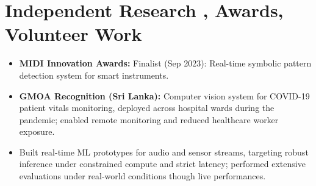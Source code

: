 \documentclass[11pt]{article}
\begin{document}
\section*{Independent Research , Awards, Volunteer Work}
\begin{itemize}[leftmargin=1.2em, itemsep=-0.25em]
    \item \textbf{MIDI Innovation Awards:} Finalist (Sep 2023): Real-time symbolic pattern detection system for smart instruments.
    \item \textbf{GMOA Recognition (Sri Lanka):} Computer vision system for COVID-19 patient vitals monitoring, deployed across hospital wards during the pandemic; enabled remote monitoring and reduced healthcare worker exposure.
    \item Built real-time ML prototypes for audio and sensor streams, targeting robust inference under constrained compute and strict latency; performed extensive evaluations under real-world conditions though live performances.
\end{itemize}
\end{document}
